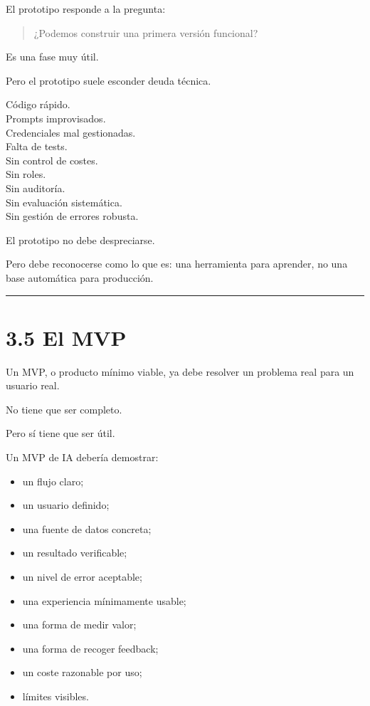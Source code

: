 El prototipo responde a la pregunta:

\begin{quote}
¿Podemos construir una primera versión funcional?
\end{quote}

Es una fase muy útil.

Pero el prototipo suele esconder deuda técnica.

Código rápido.\\
Prompts improvisados.\\
Credenciales mal gestionadas.\\
Falta de tests.\\
Sin control de costes.\\
Sin roles.\\
Sin auditoría.\\
Sin evaluación sistemática.\\
Sin gestión de errores robusta.

El prototipo no debe despreciarse.

Pero debe reconocerse como lo que es: una herramienta para aprender, no
una base automática para producción.

\begin{center}\rule{0.5\linewidth}{0.5pt}\end{center}

\section{3.5 El MVP}\label{el-mvp}

Un MVP, o producto mínimo viable, ya debe resolver un problema real para
un usuario real.

No tiene que ser completo.

Pero sí tiene que ser útil.

Un MVP de IA debería demostrar:

\begin{itemize}
\tightlist
\item
  un flujo claro;
\item
  un usuario definido;
\item
  una fuente de datos concreta;
\item
  un resultado verificable;
\item
  un nivel de error aceptable;
\item
  una experiencia mínimamente usable;
\item
  una forma de medir valor;
\item
  una forma de recoger feedback;
\item
  un coste razonable por uso;
\item
  límites visibles.
\end{itemize}

